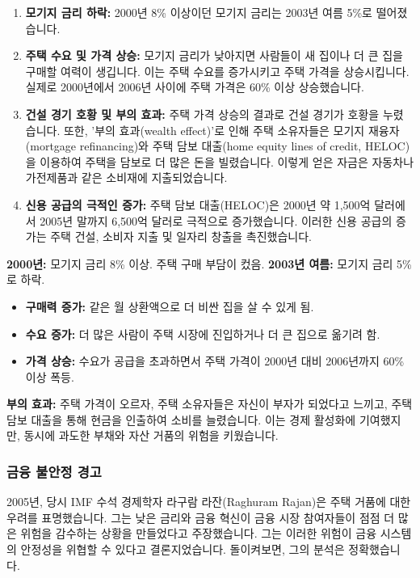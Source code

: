 \documentclass[11pt,a4paper]{book}
\theoremstyle{definition}
\begin{document}
\begin{enumerate}
    \item \textbf{모기지 금리 하락:}
    2000년 8\% 이상이던 모기지 금리는 2003년 여름 5\%로 떨어졌습니다.

    \item \textbf{주택 수요 및 가격 상승:}
    모기지 금리가 낮아지면 사람들이 새 집이나 더 큰 집을 구매할 여력이 생깁니다. 이는 주택 수요를 증가시키고 주택 가격을 상승시킵니다. 실제로 2000년에서 2006년 사이에 주택 가격은 60\% 이상 상승했습니다.

    \item \textbf{건설 경기 호황 및 부의 효과:}
    주택 가격 상승의 결과로 건설 경기가 호황을 누렸습니다. 또한, '부의 효과(wealth effect)'로 인해 주택 소유자들은 모기지 재융자(mortgage refinancing)와 주택 담보 대출(home equity lines of credit, HELOC)을 이용하여 주택을 담보로 더 많은 돈을 빌렸습니다. 이렇게 얻은 자금은 자동차나 가전제품과 같은 소비재에 지출되었습니다.

    \item \textbf{신용 공급의 극적인 증가:}
    주택 담보 대출(HELOC)은 2000년 약 1,500억 달러에서 2005년 말까지 6,500억 달러로 극적으로 증가했습니다. 이러한 신용 공급의 증가는 주택 건설, 소비자 지출 및 일자리 창출을 촉진했습니다.
\end{enumerate}

\begin{examplebox}[title={모기지 금리 하락과 주택 시장의 변화}]
\textbf{2000년:} 모기지 금리 8\% 이상. 주택 구매 부담이 컸음.
\textbf{2003년 여름:} 모기지 금리 5\%로 하락.
\begin{itemize}
    \item \textbf{구매력 증가:} 같은 월 상환액으로 더 비싼 집을 살 수 있게 됨.
    \item \textbf{수요 증가:} 더 많은 사람이 주택 시장에 진입하거나 더 큰 집으로 옮기려 함.
    \item \textbf{가격 상승:} 수요가 공급을 초과하면서 주택 가격이 2000년 대비 2006년까지 60\% 이상 폭등.
\end{itemize}
\textbf{부의 효과:} 주택 가격이 오르자, 주택 소유자들은 자신이 부자가 되었다고 느끼고, 주택 담보 대출을 통해 현금을 인출하여 소비를 늘렸습니다. 이는 경제 활성화에 기여했지만, 동시에 과도한 부채와 자산 거품의 위험을 키웠습니다.
\end{examplebox}

\subsubsection{금융 불안정 경고}
2005년, 당시 IMF 수석 경제학자 라구람 라잔(Raghuram Rajan)은 주택 거품에 대한 우려를 표명했습니다. 그는 낮은 금리와 금융 혁신이 금융 시장 참여자들이 점점 더 많은 위험을 감수하는 상황을 만들었다고 주장했습니다. 그는 이러한 위험이 금융 시스템의 안정성을 위협할 수 있다고 결론지었습니다. 돌이켜보면, 그의 분석은 정확했습니다.
\end{document}
